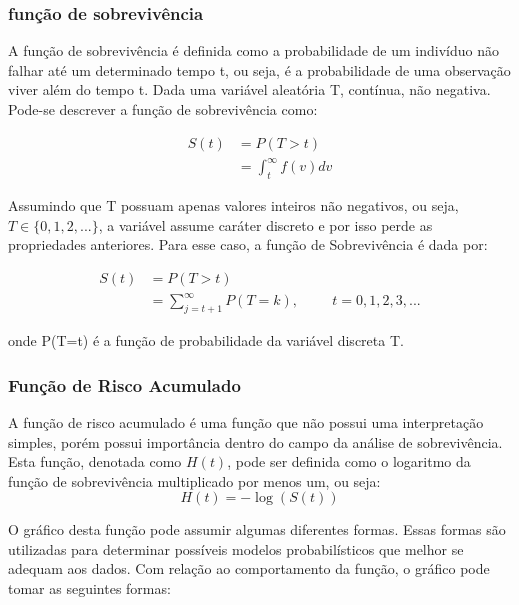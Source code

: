 \documentclass[
	article,
	12pt,				%
	openright,			%
	twoside,			%
	a4paper,			%
	english,			%
	french,				%
	spanish,			%
	brazil				%
	]{abntex2}
\begin{document}
\subsubsection{função de sobrevivência}

A função de sobrevivência é definida como a probabilidade de um indivíduo não falhar até um determinado tempo t, ou seja, é a probabilidade de uma observação viver além do tempo t. Dada uma variável aleatória T, contínua, não negativa. Pode-se descrever a função de sobrevivência como:

\begin{equation} \label{eq:1}
	\begin{split}
		S(t) & = P(T > t) \\
		& = \int_t^{\infty} f(v)dv 
  	\end{split}
\end{equation} 

Assumindo que T possuam apenas valores inteiros não negativos, ou seja, $ T \in \{0, 1, 2, ...\}$, a variável assume caráter discreto e por isso perde as propriedades anteriores. Para esse caso, a função de Sobrevivência é dada por:

\begin{equation} \label{eq:survDisc}
	\begin{split}
		S(t) & = P(T > t) \\
		& = \sum_{j=t+1}^{\infty} P(T = k), \hspace{1cm} t=0,1,2,3,...
  	\end{split}
\end{equation} 

onde P(T=t) é a função de probabilidade da variável discreta T.

\subsubsection{Função de Risco Acumulado}

A função de risco acumulado é uma função que não possui uma interpretação simples, porém possui importância dentro do campo da análise de sobrevivência. Esta função, denotada como $H(t)$, pode ser definida como o logaritmo da função de sobrevivência multiplicado por menos um, ou seja:
\begin{equation} \label{eq:riskcum}
 H(t) = -\log(S(t))
\end{equation}

O gráfico desta função pode assumir algumas diferentes formas. Essas formas são utilizadas para determinar possíveis modelos probabilísticos que melhor se adequam aos dados. Com relação ao comportamento da função, o gráfico pode tomar as seguintes formas:
\end{document}
